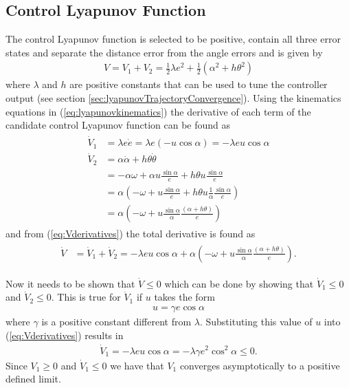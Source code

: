 \subsection{Control Lyapunov Function}
\label{sec:controllyapunov}
The control Lyapunov function is selected to be positive, contain all three error states and separate the distance error from the angle errors and is given by
\begin{align*}
V = V_1 + V_2 = \frac{1}{2}\lambda e^2 + \frac{1}{2}\left(\alpha^2+h\theta^2\right)
\end{align*}
where $\lambda$ and $h$ are positive constants that can be used to tune the controller output (see section \ref{sec:lyapunovTrajectoryConvergence}). Using the kinematics equations in (\ref{eq:lyapunovkinematics}) the derivative of each term of the candidate control Lyapunov function can be found as
\begin{align}
\label{eq:Vderivatives}
\begin{split}
\dot{V}_1 &= \lambda e\dot{e} = \lambda e (-u\cos\alpha) = -\lambda eu\cos\alpha \\
\dot{V}_2 &= \alpha\dot{\alpha}+h\theta\dot{\theta} \\
&= -\alpha\omega + \alpha u\frac{\sin\alpha}{e} + h\theta u\frac{\sin\alpha}{e} \\
&= \alpha\left(-\omega + u\frac{\sin\alpha}{e} + h\theta u\frac{1}{\alpha}\frac{\sin\alpha}{e}\right) \\
&= \alpha\left(-\omega + u\frac{\sin\alpha}{\alpha}\frac{(\alpha+h\theta)}{e}\right)
\end{split}
\end{align}
and from (\ref{eq:Vderivatives}) the total derivative is found as
\begin{align}
\label{eq:lyapunovfunctionderivative}
\begin{split}
\dot{V} &= \dot{V}_1 + \dot{V}_2 = -\lambda e u\cos\alpha + \alpha\left(-\omega+u\frac{\sin\alpha}{\alpha}\frac{(\alpha+h\theta)}{e}\right).
\end{split}
\end{align}

Now it needs to be shown that $\dot{V}\leq0$ which can be done by showing that $\dot{V}_1\leq0$ and $\dot{V}_2\leq0$. This is true for $\dot{V}_1$ if $u$ takes the form
\begin{align}
\label{eq:lyapunovu}
u = \gamma e\cos\alpha
\end{align}
where $\gamma$ is a positive constant different from $\lambda$. Substituting this value of $u$ into (\ref{eq:Vderivatives}) results in
\begin{align}
\label{eq:V1dotfinal}
\dot{V}_1 = -\lambda eu\cos\alpha = -\lambda\gamma e^2\cos^2\alpha \leq 0.
\end{align}
Since $V_1\geq0$ and $\dot{V}_1\leq0$ we have that $V_1$ converges asymptotically to a positive defined limit.

